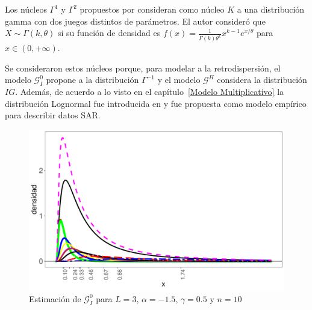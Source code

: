 Los núcleos $\Gamma^1$ y $\Gamma^2$ propuestos por \citet{chensx2000} consideran como núcleo $K$ a una distribución gamma con dos juegos distintos de parámetros. El autor consideró que $X \sim \Gamma(k,\theta)$ si su función de densidad es $f(x)=\frac{1}{\Gamma(k) \theta^k} x^{k-1} e^{x/\theta}$ para $x \in (0,+\infty)$. 

Se consideraron estos núcleos porque, para modelar a la retrodispersión, el modelo $\mathcal{G}_I^0$ propone a la distribución $\Gamma^{-1}$ y el modelo $\mathcal{G}^H$ considera la distribución $IG$. Además, de acuerdo a lo visto en el capítulo~\ref{Modelo Multiplicativo} la distribución Lognormal fue introducida en \citet{oliverquegan98} y fue propuesta como modelo empírico para describir datos SAR.



\begin{figure}[hbt]
	\centering
	\includegraphics[scale=0.5]{../../Figures/Tesis/Capitulo5/EstimacionDensidadconLN.pdf}
	\caption{\label{EstimacionLN}Estimación de $\mathcal{G}_I^0$ para $L=3$, $\alpha=-1.5$, $\gamma=0.5$ y $n=10$}
\end{figure}

